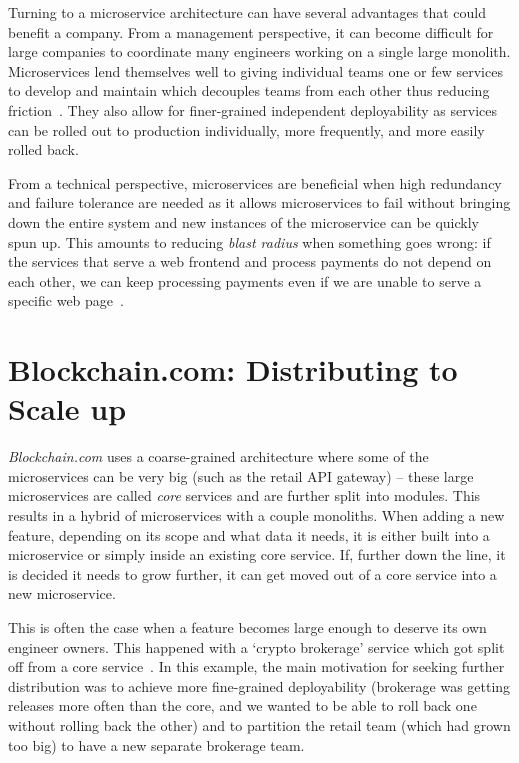 \documentclass[conference]{IEEEtran}
\begin{document}
    Turning to a microservice architecture can have several advantages that could benefit a company.
    From a management perspective, it can become difficult for large companies to coordinate many engineers working on a single large monolith.
    Microservices lend themselves well to giving individual teams one or few services to develop and maintain which decouples teams from each other thus reducing friction~\cite{awsTeamPart}.
    They also allow for finer-grained independent deployability as services can be rolled out to production individually, more frequently, and more easily rolled back.

    From a technical perspective, microservices are beneficial when high redundancy and failure tolerance are needed as it allows microservices to fail without bringing down the entire system and new instances of the microservice can be quickly spun up. This amounts to reducing \emph{blast radius} when something
    goes wrong: if the services that serve a web frontend and process payments do
    not depend on each other, we can keep processing payments even if we are unable
    to serve a specific web page~\cite{blastRadius}.



    \section{Blockchain.com: Distributing to Scale up}
    \textit{Blockchain.com} uses a coarse-grained architecture where some of the microservices can be very big
    (such as the retail API gateway) -- these large microservices are called \emph{core} services and are further split into modules.
    This results in a hybrid of microservices with a couple monoliths.
    When adding a new feature, depending on its scope and what data it needs, it is either built into a microservice or simply inside an existing core service.
    If, further down the line, it is decided it needs to grow further, it can get moved out of a core service into a new microservice.

    This is often the case when a feature becomes large enough to deserve its own engineer owners.
    This happened with a `crypto brokerage' service which got split off from a core service~\cite{bcBrokerageSplit}.
    In this example, the main motivation for seeking further distribution was to achieve more fine-grained deployability (brokerage was getting releases more often than the core, and we wanted to be able to roll back one without rolling back the other) and to partition the retail team (which had grown too big) to have a new separate brokerage team.
\end{document}
